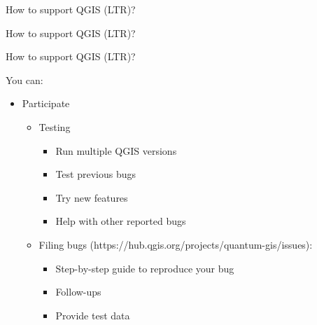 \begin{frame}{How to support QGIS (LTR)?}
\end{frame}

\begin{frame}{How to support QGIS (LTR)?}
\end{frame}

\begin{frame}{How to support QGIS (LTR)?}
	\begin{block}{You can:}
		\begin{itemize}
			\item Participate
			\begin{itemize}
				\item Testing
				\begin{itemize}
					\item Run multiple QGIS versions
					\item Test previous bugs
					\item Try new features
					\item Help with other reported bugs
				\end{itemize}
				\item Filing bugs (https://hub.qgis.org/projects/quantum-gis/issues):
				\begin{itemize}
					\item Step-by-step guide to reproduce your bug
					\item Follow-ups
					\item Provide test data
				\end{itemize}
			\end{itemize}
		\end{itemize}
	\end{block}
\end{frame}

